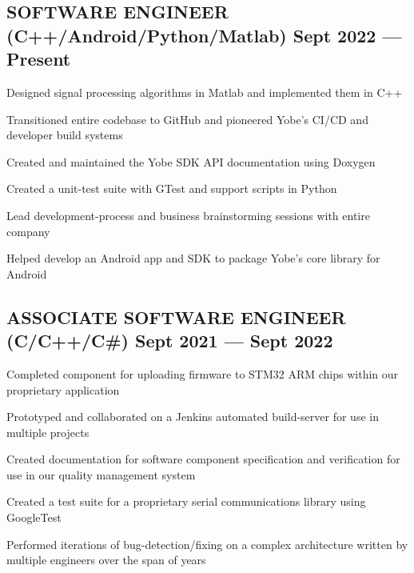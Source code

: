 \documentclass[letter,10pt]{article}
\begin{document}
\subsection{{SOFTWARE ENGINEER (C++/Android/Python/Matlab) \texorpdfstring{\hfill}{\space} Sept 2022 --- Present}}
\begin{zitemize}
    \item Designed signal processing algorithms in Matlab and implemented them in C++
    \item Transitioned entire codebase to GitHub and pioneered Yobe's CI/CD and developer build systems
    \item Created and maintained the Yobe SDK API documentation using Doxygen
    \item Created a unit-test suite with GTest and support scripts in Python
    \item Lead development-process and business brainstorming sessions with entire company
    \item Helped develop an Android app and SDK to package Yobe's core library for Android
\end{zitemize}

\subsection{{ASSOCIATE SOFTWARE ENGINEER (C/C++/C\#) \texorpdfstring{\hfill}{\space} Sept 2021 --- Sept 2022}}
\begin{zitemize}
    \item Completed component for uploading firmware to STM32 ARM chips within our proprietary application
    \item Prototyped and collaborated on a Jenkins automated build-server for use in multiple projects
    \item Created documentation for software component specification and verification for use in our quality management system
    \item Created a test suite for a proprietary serial communications library using GoogleTest
    \item Performed iterations of bug-detection/fixing on a complex architecture written by multiple engineers over the span of years
\end{zitemize}
\end{document}
